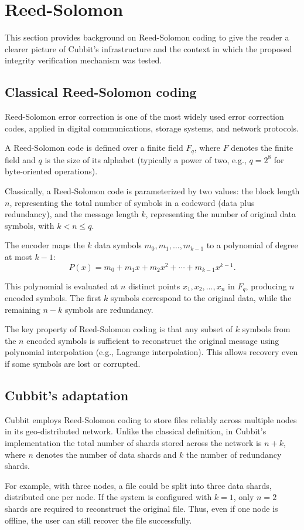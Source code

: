 \section{Reed-Solomon} \label{sec:reed-solomon}

This section provides background on Reed-Solomon coding to give the reader a clearer picture of Cubbit's infrastructure and the context in which the proposed integrity verification mechanism was tested.

\subsection{Classical Reed-Solomon coding}

Reed-Solomon error correction \cite{reed1960polynomial} is one of the most widely used error correction codes, applied in digital communications, storage systems, and network protocols.

A Reed-Solomon code is defined over a finite field $F_q$, where $F$ denotes the finite field and $q$ is the size of its alphabet (typically a power of two, e.g., $q=2^8$ for byte-oriented operations).  

Classically, a Reed-Solomon code is parameterized by two values: the block length $n$, representing the total number of symbols in a codeword (data plus redundancy), and the message length $k$, representing the number of original data symbols, with $k < n \leq q$.

The encoder maps the $k$ data symbols $m_0, m_1, \ldots, m_{k-1}$ to a polynomial of degree at most $k-1$:
\begin{equation}
P(x) = m_0 + m_1x + m_2x^2 + \cdots + m_{k-1}x^{k-1}.
\end{equation}

This polynomial is evaluated at $n$ distinct points $x_1, x_2, \ldots, x_n$ in $F_q$, producing $n$ encoded symbols. The first $k$ symbols correspond to the original data, while the remaining $n-k$ symbols are redundancy.  

The key property of Reed-Solomon coding is that any subset of $k$ symbols from the $n$ encoded symbols is sufficient to reconstruct the original message using polynomial interpolation (e.g., Lagrange interpolation). This allows recovery even if some symbols are lost or corrupted.

\subsection{Cubbit's adaptation} \label{sec:reed-solomon-in-cubbit}

Cubbit employs Reed-Solomon coding to store files reliably across multiple nodes in its geo-distributed network. Unlike the classical definition, in Cubbit's implementation the total number of shards stored across the network is $n+k$, where $n$ denotes the number of data shards and $k$ the number of redundancy shards.

For example, with three nodes, a file could be split into three data shards,
distributed one per node. If the system is configured with $k=1$, only $n=2$
shards are required to reconstruct the original file. Thus, even if one node is offline, the user can still recover the file successfully.  
